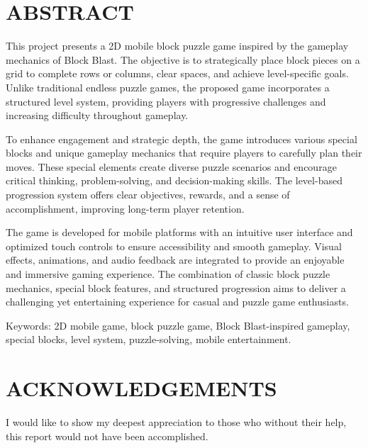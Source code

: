 \documentclass[a4paper,12pt]{report}
\begin{document}
\vspace{0.7cm}
\tableofcontents
\clearpage

\listoffigures

\clearpage

\listoftables
\clearpage

\clearpage

\chapter*{ABSTRACT}
This project presents a 2D mobile block puzzle game inspired by the gameplay mechanics of Block Blast. The objective is to strategically place block pieces on a grid to complete rows or columns, clear spaces, and achieve level-specific goals. Unlike traditional endless puzzle games, the proposed game incorporates a structured level system, providing players with progressive challenges and increasing difficulty throughout gameplay.

To enhance engagement and strategic depth, the game introduces various special blocks and unique gameplay mechanics that require players to carefully plan their moves. These special elements create diverse puzzle scenarios and encourage critical thinking, problem-solving, and decision-making skills. The level-based progression system offers clear objectives, rewards, and a sense of accomplishment, improving long-term player retention.

The game is developed for mobile platforms with an intuitive user interface and optimized touch controls to ensure accessibility and smooth gameplay. Visual effects, animations, and audio feedback are integrated to provide an enjoyable and immersive gaming experience. The combination of classic block puzzle mechanics, special block features, and structured progression aims to deliver a challenging yet entertaining experience for casual and puzzle game enthusiasts.

Keywords: 2D mobile game, block puzzle game, Block Blast-inspired gameplay, special blocks, level system, puzzle-solving, mobile entertainment.


\clearpage


\chapter*{ACKNOWLEDGEMENTS}
I would like to show my deepest appreciation to those who without their help, this report would not have been accomplished.
\end{document}
